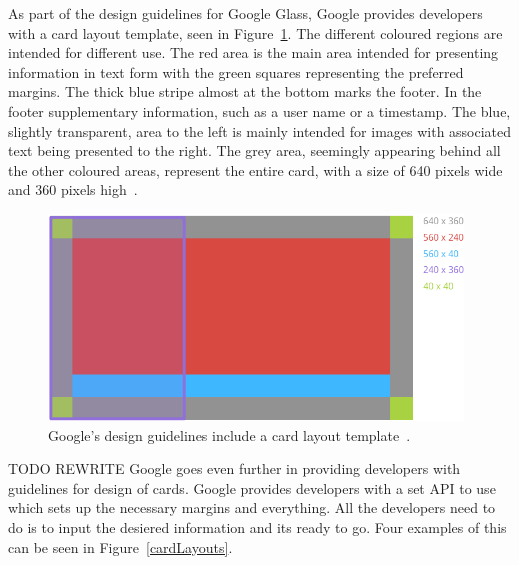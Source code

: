 As part of the design guidelines for Google Glass, Google provides developers with a card layout template, seen in Figure~\ref{GlassDesignStyle}. The different coloured regions are intended for different use. The red area is the main area intended for presenting information in text form with the green squares representing the preferred margins. The thick blue stripe almost at the bottom marks the footer. In the footer supplementary information, such as a user name or a timestamp. The blue,  slightly transparent, area to the left is mainly intended for images with associated text being presented to the right. The grey area, seemingly appearing behind all the other coloured areas, represent the entire card, with a size of 640 pixels wide and 360 pixels high~\cite{glassDesignStyle}.

	\begin{figure}[ht!]
		\centering
		\includegraphics[width=110mm]{images/standard-template}
		\caption{Google's design guidelines include a card layout template~\cite{glassDesignStyle}.}
		\label{GlassDesignStyle}
	\end{figure}

TODO REWRITE
Google goes even further in providing developers with guidelines for design of cards. Google provides developers with a set API to use which sets up the necessary margins and everything. All the developers need to do is to input the desiered information and its ready to go. Four examples of this can be seen in Figure~\ref{cardLayouts}.


